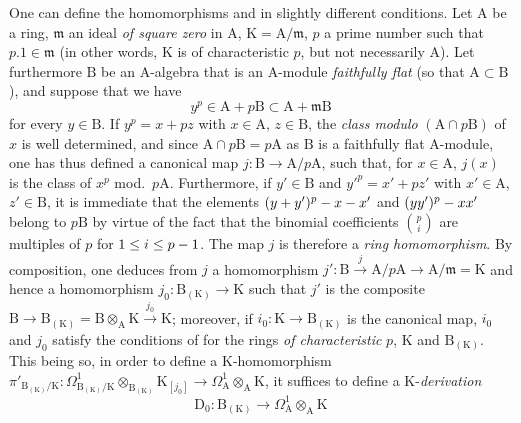 \begin{remark}[22.4.8]
\label{0.22.4.8}
One can define the homomorphisms  and  in slightly different conditions.
Let $\mathrm{A}$ be a ring, $\mathfrak{m}$ an ideal \emph{of square zero} in $\mathrm{A}$, $\mathrm{K}=\mathrm{A}/\mathfrak{m}$, $p$ a prime number such that $p.1\in\mathfrak{m}$ (in other words, $\mathrm{K}$ is of characteristic $p$, but not necessarily $\mathrm{A}$).
Let furthermore $\mathrm{B}$ be an $\mathrm{A}$-algebra that is an $\mathrm{A}$-module \emph{faithfully flat} (so that $\mathrm{A}\subset\mathrm{B}$), and suppose that we have
\[
\label{0.22.4.8.1}
  y^p\in\mathrm{A}+p\mathrm{B}\subset\mathrm{A}+\mathfrak{m}\mathrm{B}
  \tag{22.4.8.1}
\]
for every $y\in\mathrm{B}$.
If $y^p=x+pz$ with $x\in\mathrm{A}$, $z\in\mathrm{B}$, the \emph{class modulo} $(\mathrm{A}\cap p\mathrm{B})$ of $x$ is well determined, and since $\mathrm{A}\cap p\mathrm{B}=p\mathrm{A}$ as $\mathrm{B}$ is a faithfully flat $\mathrm{A}$-module, one has thus defined a canonical map $j:\mathrm{B}\to\mathrm{A}/p\mathrm{A}$, such that, for $x\in\mathrm{A}$, $j(x)$ is the class of $x^p$ mod.~$p\mathrm{A}$.
Furthermore, if $y'\in\mathrm{B}$ and $y'^p=x'+pz'$ with $x'\in\mathrm{A}$, $z'\in\mathrm{B}$, it is immediate that the elements $(y+y')^p- x- x'$ and $(yy')^p- xx'$ belong to $p\mathrm{B}$ by virtue of the fact that the binomial coefficients $\binom{p}{i}$ are multiples of $p$ for $1\leq i\leq p- 1$.
The map $j$ is therefore a \emph{ring homomorphism}.
By composition, one deduces from $j$ a homomorphism $j':\mathrm{B}\xrightarrow{j}\mathrm{A}/p\mathrm{A}\to\mathrm{A}/\mathfrak{m}=\mathrm{K}$ and hence a homomorphism $j_0:\mathrm{B}_{(\mathrm{K})}\to\mathrm{K}$ such that $j'$ is the composite $\mathrm{B}\to\mathrm{B}_{(\mathrm{K})}=\mathrm{B}\otimes_\mathrm{A}\mathrm{K}\xrightarrow{j_0}\mathrm{K}$; moreover, if $i_0:\mathrm{K}\to\mathrm{B}_{(\mathrm{K})}$ is the canonical map, $i_0$ and $j_0$ satisfy the conditions of  for the rings \emph{of characteristic} $p$, $\mathrm{K}$ and $\mathrm{B}_{(\mathrm{K})}$.
This being so, in order to define a $\mathrm{K}$-homomorphism $\pi'_{\mathrm{B}_{(\mathrm{K})}/\mathrm{K}}:\Omega^1_{\mathrm{B}_{(\mathrm{K})}/\mathrm{K}}\otimes_{\mathrm{B}_{(\mathrm{K})}}\mathrm{K}_{[j_0]}\to\Omega^1_\mathrm{A}\otimes_\mathrm{A}\mathrm{K}$, it suffices  to define a $\mathrm{K}$-\emph{derivation}
\[
\label{0.22.4.8.2}
  \mathrm{D}_0:\mathrm{B}_{(\mathrm{K})}\to\Omega^1_\mathrm{A}\otimes_\mathrm{A}\mathrm{K}
  \tag{22.4.8.2}
\]
\end{remark}
